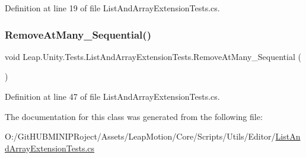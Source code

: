 Definition at line 19 of file List\+And\+Array\+Extension\+Tests.\+cs.

\mbox{\label{class_leap_1_1_unity_1_1_tests_1_1_list_and_array_extension_tests_a7fa8e4a81d70bc03a3647009de60832b}} 
\subsubsection{\texorpdfstring{RemoveAtMany\_Sequential()}{RemoveAtMany\_Sequential()}}
{\footnotesize\ttfamily void Leap.\+Unity.\+Tests.\+List\+And\+Array\+Extension\+Tests.\+Remove\+At\+Many\+\_\+\+Sequential (\begin{DoxyParamCaption}{ }\end{DoxyParamCaption})}



Definition at line 47 of file List\+And\+Array\+Extension\+Tests.\+cs.



The documentation for this class was generated from the following file\+:\begin{DoxyCompactItemize}
\item 
O\+:/\+Git\+H\+U\+B\+M\+I\+N\+I\+P\+Roject/\+Assets/\+Leap\+Motion/\+Core/\+Scripts/\+Utils/\+Editor/\mbox{\hyperlink{_list_and_array_extension_tests_8cs}{List\+And\+Array\+Extension\+Tests.\+cs}}\end{DoxyCompactItemize}
